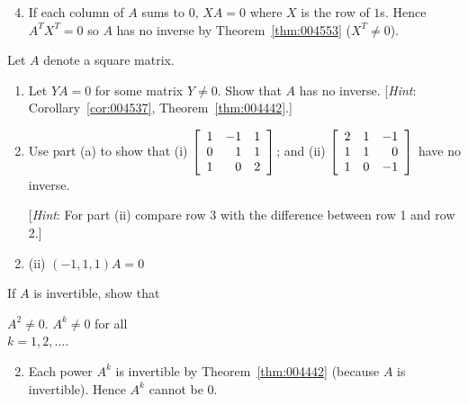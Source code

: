 \begin{multicols}{2}
\begin{ex}
\begin{sol}
\begin{enumerate}[label={\alph*.}]
\setcounter{enumi}{3}
\item  If each column of $A$ sums to $0$, $XA = 0$ where $X$ is the row of $1$s. Hence $A^{T}X^{T} = 0$ so $A$ has no inverse by Theorem~\ref{thm:004553} ($X^{T} \neq 0$).

\end{enumerate}
\end{sol}
\end{ex}

\begin{ex}
Let $A$ denote a square matrix.


\begin{enumerate}[label={\alph*.}]
\item Let $YA = 0$ for some matrix $Y \neq 0$. Show that $A$ has no inverse. [\textit{Hint}: Corollary~\ref{cor:004537}, Theorem~\ref{thm:004442}.]

\item Use part (a) to show that (i) $\left[ \begin{array}{rrr}
1 & -1 & 1 \\
0 & 1 & 1 \\
1 & 0 & 2
\end{array} \right]$; and (ii) $\left[ \begin{array}{rrr}
 2 & 1 & -1 \\
 1 & 1 & 0 \\
 1 & 0 & -1
 \end{array} \right]$
 have no inverse.


[\textit{Hint}: For part (ii) compare row 3 with the difference between row 1 and row 2.]

\end{enumerate}
\begin{sol}
\begin{enumerate}[label={\alph*.}]
\setcounter{enumi}{1}
\item (ii) $(-1, 1, 1)A = 0$

\end{enumerate}
\end{sol}
\end{ex}

\begin{ex}
If $A$ is invertible, show that
\begin{exenumerate}[column-sep=-5em]
\exitem $A^{2} \neq 0$.
\exitem $A^{k} \neq 0$ for all \\$k = 1, 2, \dots$.
\end{exenumerate}
\begin{sol}
\begin{enumerate}[label={\alph*.}]
\setcounter{enumi}{1}
\item Each power $A^{k}$ is invertible by Theorem~\ref{thm:004442} (because $A$ is invertible). Hence $A^{k}$ cannot be $0$.


\end{enumerate}
\end{sol}
\end{ex}
\end{multicols}
